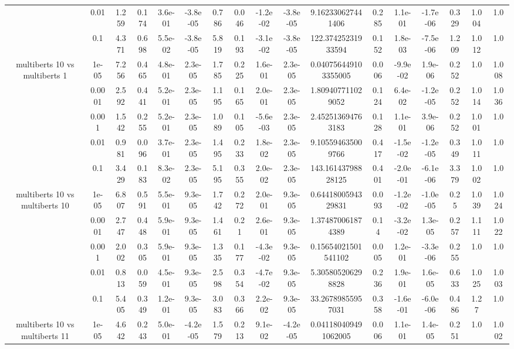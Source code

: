 \begin{tabular}{|c|c|c|c|c|c|c|c|c|c|c|c|c|c|c|c|c|}
 & 0.01 & 1.259 & 0.174 & 3.6e-01 & -3.8e-05 & 0.786 & 0.046 & -1.2e-02 & -3.8e-05 & 9.162330627441406 & 0.285 & 1.1e-01 & -1.7e-06 & 0.329 & 1.004 & 1.0 \\
 & 0.1 & 4.371 & 0.698 & 5.5e-02 & -3.8e-05 & 5.819 & 0.193 & -3.1e-02 & -3.8e-05 & 122.37425231933594 & 0.152 & 1.8e-03 & -7.5e-06 & 1.209 & 1.012 & 1.0 \\
\hline
\multirow{5}{*}{multiberts 10 vs multiberts 1} & 1e-05 & 7.256 & 0.465 & 4.8e-01 & 2.3e-05 & 1.785 & 0.225 & 1.6e-01 & 2.3e-05 & 0.040756449103355005 & 0.006 & -9.9e-02 & 1.9e-06 & 0.252 & 1.0 & 1.008 \\
 & 0.0001 & 2.592 & 0.441 & 5.2e-01 & 2.3e-05 & 1.195 & 0.165 & 2.0e-01 & 2.3e-05 & 1.809407711029052 & 0.124 & 6.4e-02 & -1.2e-05 & 0.252 & 1.014 & 1.036 \\
 & 0.001 & 1.542 & 0.255 & 5.2e-01 & 2.3e-05 & 1.089 & 0.105 & -5.6e-03 & 2.3e-05 & 2.452513694763183 & 0.128 & 1.1e-01 & 3.9e-06 & 0.252 & 1.001 & 1.0 \\
 & 0.01 & 0.981 & 0.096 & 3.7e-01 & 2.3e-05 & 1.495 & 0.233 & 1.8e-02 & 2.3e-05 & 9.105594635009766 & 0.417 & -1.5e-02 & -1.2e-05 & 0.349 & 1.011 & 1.0 \\
 & 0.1 & 3.429 & 0.183 & 8.3e-02 & 2.3e-05 & 5.195 & 0.355 & 2.0e-02 & 2.3e-05 & 143.16143798828125 & 0.401 & -2.0e-01 & -6.1e-06 & 3.379 & 1.002 & 1.0 \\
\hline
\multirow{5}{*}{multiberts 10 vs multiberts 10} & 1e-05 & 6.807 & 0.591 & 5.5e-01 & 9.3e-05 & 1.742 & 0.272 & 2.0e-01 & 9.3e-05 & 0.6441800594329831 & 0.093 & -1.2e-02 & -1.0e-05 & 0.25 & 1.039 & 1.024 \\
 & 0.0001 & 2.747 & 0.448 & 5.9e-01 & 9.3e-05 & 1.461 & 0.21 & 2.6e-01 & 9.3e-05 & 1.374870061874389 & 0.14 & -3.2e-02 & 1.3e-05 & 0.257 & 1.111 & 1.022 \\
 & 0.001 & 2.002 & 0.305 & 5.9e-01 & 9.3e-05 & 1.335 & 0.177 & -4.3e-02 & 9.3e-05 & 0.15654021501541102 & 0.005 & 1.2e-01 & -3.3e-06 & 0.255 & 1.0 & 1.0 \\
 & 0.01 & 0.813 & 0.059 & 4.5e-01 & 9.3e-05 & 2.598 & 0.354 & -4.7e-02 & 9.3e-05 & 5.305805206298828 & 0.236 & 1.9e-01 & 1.6e-05 & 0.633 & 1.025 & 1.003 \\
 & 0.1 & 5.405 & 0.349 & 1.2e-01 & 9.3e-05 & 3.083 & 0.366 & 2.2e-02 & 9.3e-05 & 33.26789855957031 & 0.358 & -1.6e-01 & -6.0e-06 & 0.486 & 1.27 & 1.0 \\
\hline
\multirow{5}{*}{multiberts 10 vs multiberts 11} & 1e-05 & 4.642 & 0.243 & 5.0e-01 & -4.2e-05 & 1.579 & 0.213 & 9.1e-02 & -4.2e-05 & 0.041180409491062005 & 0.006 & 1.1e-01 & 1.4e-05 & 0.251 & 1.0 & 1.002 \\

\end{tabular}
